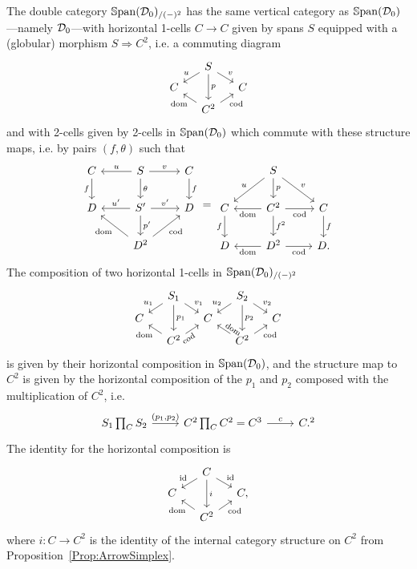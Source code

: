 The double category $\mathbb{S}\mathrm{pan}(\mathcal{D}_0)_{/(-)^2}$ has the same vertical category as $\mathbb{S}\mathrm{pan}(\mathcal{D}_0)$---namely $\mathcal{D}_0$---with horizontal 1-cells $C\to C$ given by spans $S$ equipped with a (globular) morphism $S\Rightarrow C^2$, i.e. a commuting diagram
\[
\begin{tikzcd}[row sep=tiny,column sep=small]
	{} & S \dlar[swap]{u} \drar{v} \ar{dd}{p} & \\
	C && C \\
	& C^2 \ular{\dom} \urar[swap]{\cod}
\end{tikzcd}
\]
and with 2-cells given by 2-cells in $\mathbb{S}\mathrm{pan}(\mathcal{D}_0)$ which commute with these structure maps, i.e. by pairs $(f,\theta)$ such that
\[
\begin{tikzcd}
	C \dar[swap]{f} & S \lar[swap]{u} \rar{v} \dar{\theta} & C \dar{f} \\
	D & S' \lar[swap]{u'} \rar{v'} \dar{p'} & D \\[0em]
	& D^2 \ular{\dom} \urar[swap]{\cod} &
\end{tikzcd}
=
\begin{tikzcd}
	{} & S \dlar[swap]{u} \drar{v} \dar{p} & \\[0em]
	C \dar[swap]{f} & C^2 \lar{\dom} \rar[swap]{\cod} \dar{f^2} & C \dar{f} \\
	D & D^2 \lar{\dom} \rar[swap]{\cod} & D.
\end{tikzcd}
\]
The composition of two horizontal 1-cells in $\mathbb{S}\mathrm{pan}(\mathcal{D}_0)_{/(-)^2}$
\[
\begin{tikzcd}[row sep=tiny,column sep=small]
	{} & S_1 \dlar[swap]{u_1} \drar{v_1} \ar{dd}{p_1} && S_2 \dlar[swap]{u_2} \drar{v_2} \ar{dd}{p_2} \\
	C && C && C \\
	& C^2 \ular{\dom} \urar[swap][sloped,pos=0]{\cod} && C^2 \ular[sloped,pos=0]{\dom} \urar[swap]{\cod}
\end{tikzcd}
\]
is given by their horizontal composition in $\mathbb{S}\mathrm{pan}(\mathcal{D}_0)$, and the structure map to $C^2$ is given by the horizontal composition of the $p_1$ and $p_2$ composed with the multiplication of $C^2$, i.e.
\[
\begin{tikzcd}
	S_1 \prod_C S_2 \rar{(p_1,p_2)} & C^2\prod_C C^2 = C^3 \rar{c} & C.^2
\end{tikzcd}
\]
The identity for the horizontal composition is
\[
\begin{tikzcd}[row sep=tiny,column sep=small]
	{} & C \dlar[swap]{\id} \drar{\id} \ar{dd}{i} & \\
	C && C, \\
	& C^2 \ular{\dom} \urar[swap]{\cod}
\end{tikzcd}
\]
where $i\colon C\to C^2$ is the identity of the internal category structure on $C^2$ from Proposition~\ref{Prop:ArrowSimplex}.

